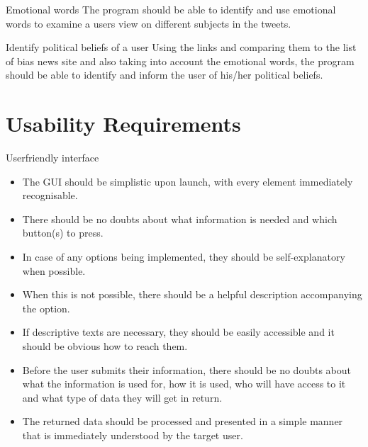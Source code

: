 \begin{requirement}{Emotional  words}
The program should be able to identify and use emotional words to examine a
users view on different subjects in the tweets. 
\end{requirement}

\begin{requirement}{Identify political beliefs of a user }
Using the links and comparing them to the list of bias news site and also taking
into account the emotional words, the program should be able to identify and
inform the user of his/her political beliefs. 
\end{requirement}



\section{Usability Requirements}

\begin{requirement}{Userfriendly interface}
\begin{itemize}
  \item The \ac{GUI} should be simplistic upon launch, with every element immediately recognisable.
  \item There should be no doubts about what information is needed and which button(s) to press.
  \item In case of any options being implemented, they should be self-explanatory when possible.
  \item When this is not possible, there should be a helpful description
  accompanying the option.
  \item If descriptive texts are necessary, they should be easily accessible and
  it should be obvious how to reach them.
  \item Before the user submits their information, there should be no doubts
  about what the information is used for, how it is used, who will have access to it and what type of data they will get in return.
  \item The returned data should be processed and presented in a simple manner that is immediately understood by the
        target user.
\end{itemize}
\end{requirement}